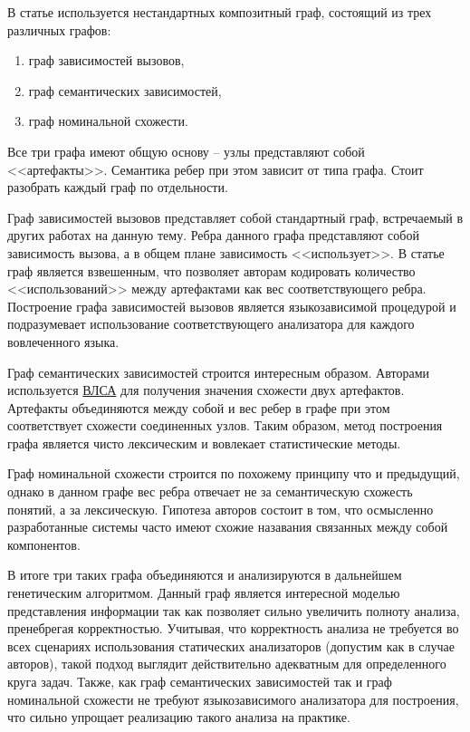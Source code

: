 В статье используется нестандартных композитный граф, состоящий из трех различных графов:
\begin{enumerate}[label=\arabic*.]
    \item граф зависимостей вызовов,
    \item граф семантических зависимостей,
    \item граф номинальной схожести.
\end{enumerate}
Все три графа имеют общую основу -- узлы представляют собой <<артефакты>>. Семантика ребер при этом зависит от типа графа.
Стоит разобрать каждый граф по отдельности.

Граф зависимостей вызовов представляет собой стандартный граф, встречаемый в других работах на данную тему. Ребра данного графа
представляют собой зависимость вызова, а в общем плане зависимость <<использует>>. В статье граф является взвешенным, что
позволяет авторам кодировать количество <<использований>> между артефактами как вес соответствующего ребра.
Построение графа зависимостей вызовов является языкозависимой процедурой и подразумевает использование соответствующего
анализатора для каждого вовлеченного языка.

Граф семантических зависимостей строится интересным образом. Авторами используется \hyperlink{ВЛСА}{ВЛСА} для получения
значения схожести двух артефактов. Артефакты объединяются между собой и вес ребер в графе при этом соответствует схожести соединенных
узлов. Таким образом, метод построения графа является чисто лексическим и вовлекает статистические методы.

Граф номинальной схожести строится по похожему принципу что и предыдущий, однако в данном графе вес ребра отвечает не
за семантическую схожесть понятий, а за лексическую. Гипотеза авторов состоит в том, что осмысленно разработанные
системы часто имеют схожие назавания связанных между собой компонентов.

В итоге три таких графа объединяются и анализируются в дальнейшем генетическим алгоритмом. Данный граф
является интересной моделью представления информации так как позволяет сильно увеличить полноту анализа, пренебрегая
корректностью. Учитывая, что корректность анализа не требуется во всех сценариях использования статических анализаторов
(допустим как в случае авторов), такой подход выглядит действительно адекватным для определенного круга задач.
Также, как граф семантических зависимостей так и граф номинальной схожести не требуют языкозависимого анализатора для построения, что
сильно упрощает реализацию такого анализа на практике.

